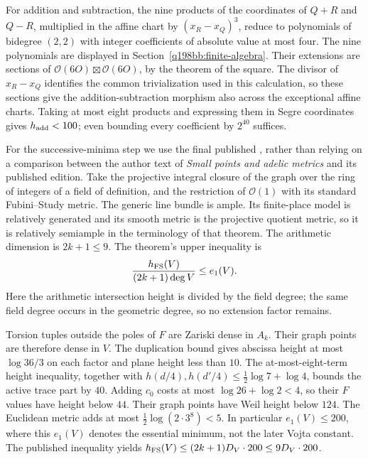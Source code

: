 For addition and subtraction, the nine products of the coordinates of
$Q+R$ and $Q-R$, multiplied in the affine chart by $(x_R-x_Q)^3$,
reduce to polynomials of bidegree $(2,2)$ with integer coefficients of
absolute value at most four. The nine polynomials are displayed in
Section~\ref{q198bb:finite-algebra}. Their extensions are sections of
$\mathcal O(6O)\boxtimes\mathcal O(6O)$, by the theorem of the square.
The divisor of $x_R-x_Q$ identifies the common trivialization used in
this calculation, so these sections give the addition-subtraction
morphism also across the exceptional affine charts.
Taking at most eight products and expressing them in Segre coordinates gives
$h_{\rm add}<100$; even bounding every coefficient by $2^{40}$ suffices.


For the successive-minima step we use the final published
\cite[Theorem~5.2, p.~208]{q198bb:Zhang}, rather than relying on
a comparison between the author text of \emph{Small points and adelic
metrics} and its published edition.  Take the projective integral
closure of the graph over the ring of integers of a field of definition,
and the restriction of $\mathcal O(1)$ with its standard Fubini--Study
metric.  The generic line bundle is ample.  Its finite-place model is
relatively generated and its smooth metric is the projective quotient
metric, so it is relatively semiample in the terminology of that theorem.
The arithmetic dimension is $2k+1\le9$.  The theorem's upper inequality is
\[
 \frac{h_{\rm FS}(V)}{(2k+1)\deg V}\le e_1(V).
\]
Here the arithmetic intersection height is divided by the field degree;
the same field degree occurs in the geometric degree, so no extension
factor remains.

Torsion tuples outside the poles of $F$ are Zariski dense in $A_k$.
Their graph points are therefore dense in $V$.
The duplication bound gives abscissa height at most $\log36/3$ on
each factor and plane height less than $10$.  The at-most-eight-term height inequality, together with
$h(d/4),h(d'/4)\le\tfrac12\log7+\log4$, bounds the active trace part
by $40$. Adding $c_0$ costs at most $\log26+\log2<4$, so their
$F$ values have height below $44$. Their graph points have Weil height
below $124$. The Euclidean metric adds at most
$\tfrac12\log(2\cdot3^8)<5$. In particular $e_1(V)\le200$, where
this $e_1(V)$ denotes the essential minimum, not the later Vojta constant.
The published inequality yields
$h_{\rm FS}(V)\le(2k+1)D_V\cdot200\le9D_V\cdot200$.

